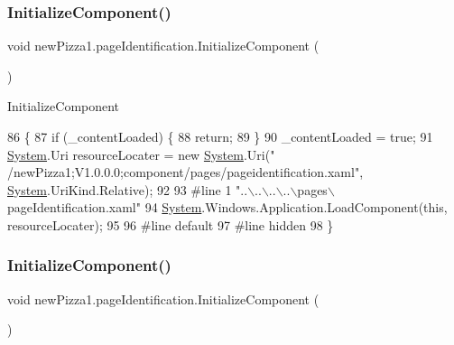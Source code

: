 \subsubsection{\texorpdfstring{Initialize\+Component()}{InitializeComponent()}\hspace{0.1cm}{\footnotesize\ttfamily [1/2]}}
{\footnotesize\ttfamily void new\+Pizza1.\+page\+Identification.\+Initialize\+Component (\begin{DoxyParamCaption}{ }\end{DoxyParamCaption})\hspace{0.3cm}{\ttfamily [inline]}}



Initialize\+Component 


\begin{DoxyCode}
86                                           \{
87             \textcolor{keywordflow}{if} (\_contentLoaded) \{
88                 \textcolor{keywordflow}{return};
89             \}
90             \_contentLoaded = \textcolor{keyword}{true};
91             \hyperlink{namespaceSystem}{System}.Uri resourceLocater = \textcolor{keyword}{new} \hyperlink{namespaceSystem}{System}.Uri(\textcolor{stringliteral}{"
      /newPizza1;V1.0.0.0;component/pages/pageidentification.xaml"}, \hyperlink{namespaceSystem}{System}.UriKind.Relative);
92             
93 \textcolor{preprocessor}{            #line 1 "..\(\backslash\)..\(\backslash\)..\(\backslash\)..\(\backslash\)pages\(\backslash\)pageIdentification.xaml"
}
94             \hyperlink{namespaceSystem}{System}.Windows.Application.LoadComponent(\textcolor{keyword}{this}, resourceLocater);
95             
96 \textcolor{preprocessor}{            #line default
}
97 \textcolor{preprocessor}{            #line hidden
}
98         \}
\end{DoxyCode}
\mbox{\label{classnewPizza1_1_1pageIdentification_adfe48959ae9c294c657f21027deed65f}} 
\subsubsection{\texorpdfstring{Initialize\+Component()}{InitializeComponent()}\hspace{0.1cm}{\footnotesize\ttfamily [2/2]}}
{\footnotesize\ttfamily void new\+Pizza1.\+page\+Identification.\+Initialize\+Component (\begin{DoxyParamCaption}{ }\end{DoxyParamCaption})\hspace{0.3cm}{\ttfamily [inline]}}



